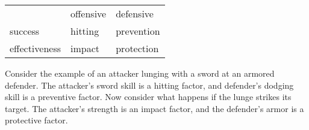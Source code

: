 \documentclass[12pt]{article}
\begin{document}
\begin{center}\begin{tabular}{l|ll}
              & offensive & defensive  \\
\cline{1-3}
success       & hitting   & prevention \\
effectiveness & impact    & protection 
\end{tabular}\end{center}
Consider the example of an attacker lunging with a sword at an armored defender.
The attacker's sword skill is a hitting factor,
and defender's dodging skill is a preventive factor.
Now consider what happens if the lunge strikes its target.
The attacker's strength is an impact factor,
and the defender's armor is a protective factor.
\end{document}
